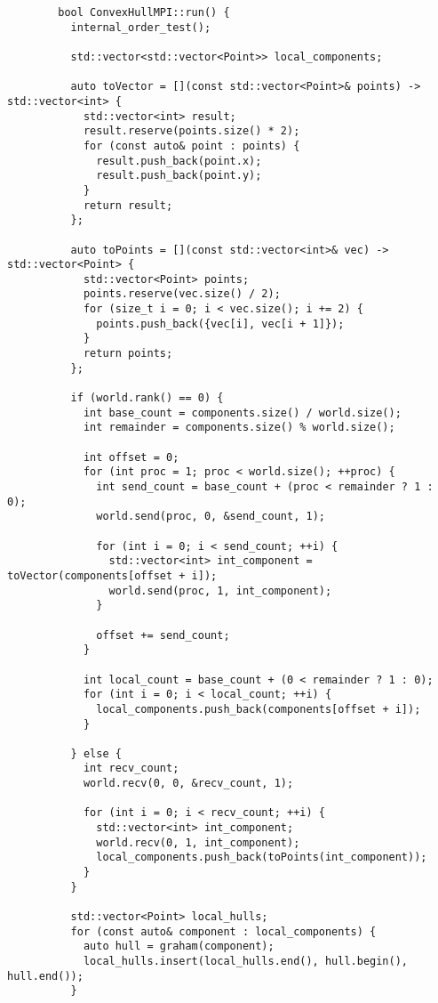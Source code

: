 \documentclass{report}
\begin{document}
\begin{lstlisting}
        bool ConvexHullMPI::run() {
          internal_order_test();
        
          std::vector<std::vector<Point>> local_components;
        
          auto toVector = [](const std::vector<Point>& points) -> std::vector<int> {
            std::vector<int> result;
            result.reserve(points.size() * 2);
            for (const auto& point : points) {
              result.push_back(point.x);
              result.push_back(point.y);
            }
            return result;
          };
        
          auto toPoints = [](const std::vector<int>& vec) -> std::vector<Point> {
            std::vector<Point> points;
            points.reserve(vec.size() / 2);
            for (size_t i = 0; i < vec.size(); i += 2) {
              points.push_back({vec[i], vec[i + 1]});
            }
            return points;
          };
        
          if (world.rank() == 0) {
            int base_count = components.size() / world.size();
            int remainder = components.size() % world.size();
        
            int offset = 0;
            for (int proc = 1; proc < world.size(); ++proc) {
              int send_count = base_count + (proc < remainder ? 1 : 0);
              world.send(proc, 0, &send_count, 1);
        
              for (int i = 0; i < send_count; ++i) {
                std::vector<int> int_component = toVector(components[offset + i]);
                world.send(proc, 1, int_component);
              }
        
              offset += send_count;
            }
        
            int local_count = base_count + (0 < remainder ? 1 : 0);
            for (int i = 0; i < local_count; ++i) {
              local_components.push_back(components[offset + i]);
            }
        
          } else {
            int recv_count;
            world.recv(0, 0, &recv_count, 1);
        
            for (int i = 0; i < recv_count; ++i) {
              std::vector<int> int_component;
              world.recv(0, 1, int_component);
              local_components.push_back(toPoints(int_component));
            }
          }
        
          std::vector<Point> local_hulls;
          for (const auto& component : local_components) {
            auto hull = graham(component);
            local_hulls.insert(local_hulls.end(), hull.begin(), hull.end());
          }
        

\end{lstlisting}
\end{document}
